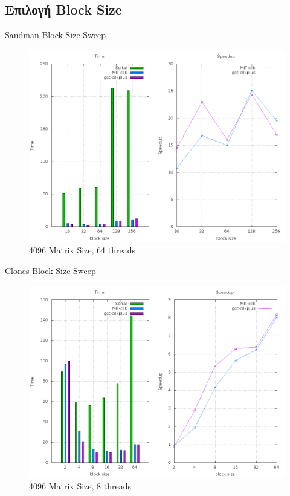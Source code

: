 \documentclass{beamer}
\begin{document}
\subsection{Επιλογή Block Size}
    \begin{frame}
        \begin{block}{Sandman Block Size Sweep}
            \begin{figure}[H]
                \centering
                \includegraphics[scale=0.25]{files/sandman_block_size_sweep_4k.png}
                \caption{4096 Matrix Size, 64 threads}
            \end{figure}
        \end{block}
    \end{frame}

    \begin{frame}
        \begin{block}{Clones Block Size Sweep}
            \begin{figure}[H]
                \centering
                \includegraphics[scale=0.25]{files/clones_block_size_sweep_4k.png}
                \caption{4096 Matrix Size, 8 threads}
            \end{figure}
        \end{block}
    \end{frame}
\end{document}
